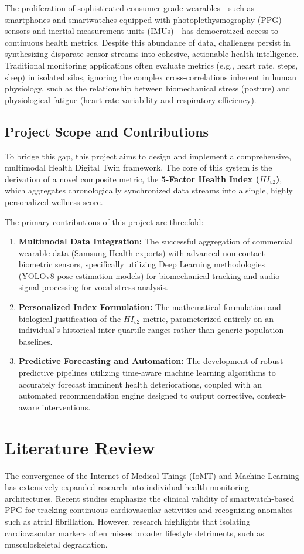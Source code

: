 \documentclass[11pt,a4paper]{article}
\begin{document}
The proliferation of sophisticated consumer-grade wearables—such as smartphones and smartwatches equipped with photoplethysmography (PPG) sensors and inertial measurement units (IMUs)—has democratized access to continuous health metrics. Despite this abundance of data, challenges persist in synthesizing disparate sensor streams into cohesive, actionable health intelligence. Traditional monitoring applications often evaluate metrics (e.g., heart rate, steps, sleep) in isolated silos, ignoring the complex cross-correlations inherent in human physiology, such as the relationship between biomechanical stress (posture) and physiological fatigue (heart rate variability and respiratory efficiency).

\subsection{Project Scope and Contributions}
To bridge this gap, this project aims to design and implement a comprehensive, multimodal Health Digital Twin framework. The core of this system is the derivation of a novel composite metric, the \textbf{5-Factor Health Index ($HI_{v2}$)}, which aggregates chronologically synchronized data streams into a single, highly personalized wellness score.

The primary contributions of this project are threefold:
\begin{enumerate}
    \item \textbf{Multimodal Data Integration:} The successful aggregation of commercial wearable data (Samsung Health exports) with advanced non-contact biometric sensors, specifically utilizing Deep Learning methodologies (YOLOv8 pose estimation models) for biomechanical tracking and audio signal processing for vocal stress analysis.
    \item \textbf{Personalized Index Formulation:} The mathematical formulation and biological justification of the $HI_{v2}$ metric, parameterized entirely on an individual’s historical inter-quartile ranges rather than generic population baselines.
    \item \textbf{Predictive Forecasting and Automation:} The development of robust predictive pipelines utilizing time-aware machine learning algorithms to accurately forecast imminent health deteriorations, coupled with an automated recommendation engine designed to output corrective, context-aware interventions.
\end{enumerate}

\section{Literature Review}
The convergence of the Internet of Medical Things (IoMT) and Machine Learning has extensively expanded research into individual health monitoring architectures. Recent studies emphasize the clinical validity of smartwatch-based PPG for tracking continuous cardiovascular activities and recognizing anomalies such as atrial fibrillation. However, research highlights that isolating cardiovascular markers often misses broader lifestyle detriments, such as musculoskeletal degradation.
\end{document}
